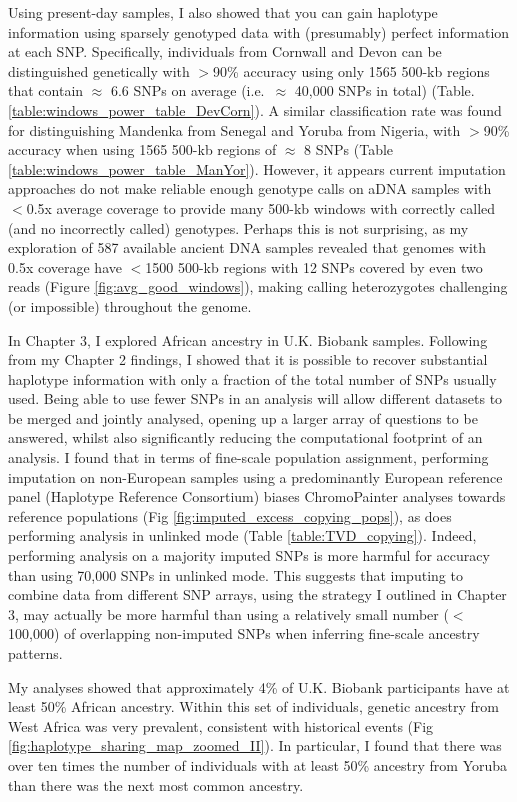 Using present-day samples, I also showed that you can gain haplotype information using sparsely genotyped data with (presumably) perfect information at each SNP. Specifically, individuals from Cornwall and Devon can be distinguished genetically with $>$90\% accuracy using only 1565 500-kb regions that contain $\approx$ 6.6 SNPs on average (i.e.\ $\approx$ 40,000 SNPs in total) (Table. \ref{table:windows_power_table_DevCorn}). A similar classification rate was found for distinguishing Mandenka from Senegal and Yoruba from Nigeria, with $>$90\% accuracy when using 1565 500-kb regions of $\approx$ 8 SNPs (Table \ref{table:windows_power_table_ManYor}). However, it appears current imputation approaches do not make reliable enough genotype calls on aDNA samples with $<$0.5x average coverage to provide many 500-kb windows with correctly called (and no incorrectly called) genotypes. Perhaps this is not surprising, as my exploration of 587 available ancient DNA samples revealed that genomes with 0.5x coverage have $<$1500 500-kb regions with 12 SNPs covered by even two reads (Figure \ref{fig:avg_good_windows}), making calling heterozygotes challenging (or impossible) throughout the genome.

In Chapter 3, I explored African ancestry in U.K. Biobank samples. Following from my Chapter 2 findings, I showed that it is possible to recover substantial haplotype information with only a fraction of the total number of SNPs usually used. Being able to use fewer SNPs in an analysis will allow different datasets to be merged and jointly analysed, opening up a larger array of questions to be answered, whilst also significantly reducing the computational footprint of an analysis. I found that in terms of fine-scale population assignment, performing imputation on non-European samples using a predominantly European reference panel (Haplotype Reference Consortium) biases ChromoPainter analyses towards reference populations (Fig \ref{fig:imputed_excess_copying_pops}), as does performing analysis in unlinked mode (Table \ref{table:TVD_copying}). Indeed, performing analysis on a majority imputed SNPs is more harmful for accuracy than using 70,000 SNPs in unlinked mode. This suggests that imputing to combine data from different SNP arrays, using the strategy I outlined in Chapter 3, may actually be more harmful than using a relatively small number ($<$100,000) of overlapping non-imputed SNPs when inferring fine-scale ancestry patterns.

My analyses showed that approximately 4\% of U.K. Biobank participants have at least 50\% African ancestry. Within this set of individuals, genetic ancestry from West Africa was very prevalent, consistent with historical events (Fig \ref{fig:haplotype_sharing_map_zoomed_II}). In particular, I found that there was over ten times the number of individuals with at least 50\% ancestry from Yoruba than there was the next most common ancestry. 

